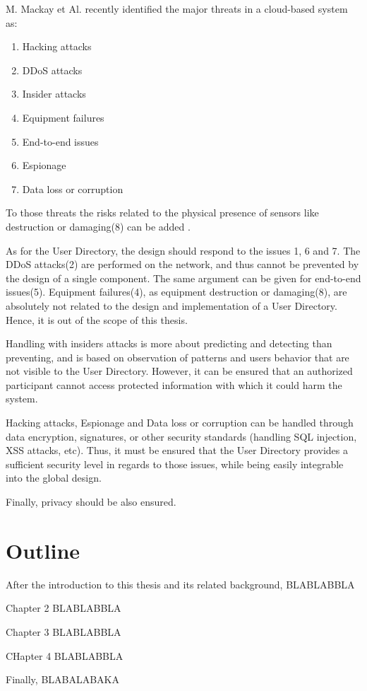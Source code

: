 M. Mackay et Al. recently identified the major threats in a cloud-based system as\cite{Mackay2012}: 
\begin{enumerate}
	\item Hacking attacks
	\item DDoS attacks
	\item Insider attacks
	\item Equipment failures
	\item End-to-end issues
	\item Espionage
	\item Data loss or corruption
\end{enumerate}

To those threats the risks related to the physical presence of sensors like destruction or damaging(8) can be added .

As for the User Directory, the design should respond to the issues 1, 6 and 7. The DDoS attacks(2) are performed on the network, and thus cannot be prevented by the design of a single component. The same argument can be given for end-to-end issues(5). Equipment failures(4), as equipment destruction or damaging(8), are absolutely not related to the design and implementation of a User Directory. Hence, it is out of the scope of this thesis. 

Handling with insiders attacks is more about predicting and detecting than preventing, and is based on observation of patterns and users behavior that are not visible to the User Directory\cite{Schultz2002}. However, it can be ensured that an authorized participant cannot access protected information with which it could harm the system.

Hacking attacks, Espionage and Data loss or corruption can be handled through data encryption, signatures, or other security standards (handling SQL injection, XSS attacks, etc). Thus, it must be ensured that the User Directory provides a sufficient security level in regards to those issues, while being easily integrable into the global design. 

Finally, privacy should be also ensured.

\section{Outline}
After the introduction to this thesis and its related background, BLABLABBLA

Chapter 2 BLABLABBLA

Chapter 3 BLABLABBLA

CHapter 4 BLABLABBLA

Finally, BLABALABAKA




